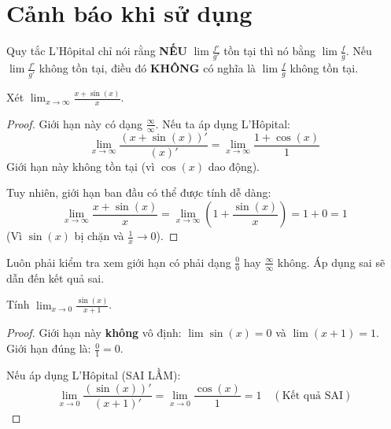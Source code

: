 \section{Cảnh báo khi sử dụng}

\begin{warning}
Quy tắc L'Hôpital chỉ nói rằng \textbf{NẾU} $\lim \frac{f'}{g'}$ tồn tại thì nó bằng $\lim \frac{f}{g}$.
Nếu $\lim \frac{f'}{g'}$ không tồn tại, điều đó \textbf{KHÔNG} có nghĩa là $\lim \frac{f}{g}$ không tồn tại.

\begin{example}
Xét $\lim_{x \to \infty} \frac{x + \sin(x)}{x}$.
\begin{proof}
Giới hạn này có dạng $\frac{\infty}{\infty}$. Nếu ta áp dụng L'Hôpital:
$$ \lim_{x \to \infty} \frac{(x + \sin(x))'}{(x)'} = \lim_{x \to \infty} \frac{1 + \cos(x)}{1} $$
Giới hạn này không tồn tại (vì $\cos(x)$ dao động).

Tuy nhiên, giới hạn ban đầu có thể được tính dễ dàng:
$$ \lim_{x \to \infty} \frac{x + \sin(x)}{x} = \lim_{x \to \infty} \left( 1 + \frac{\sin(x)}{x} \right) = 1 + 0 = 1 $$
(Vì $\sin(x)$ bị chặn và $\frac{1}{x} \to 0$).
\end{proof}
\end{example}
\end{warning}

\begin{warning}
Luôn phải kiểm tra xem giới hạn có phải dạng $\frac{0}{0}$ hay $\frac{\infty}{\infty}$ không. Áp dụng sai sẽ dẫn đến kết quả sai.

\begin{example}
Tính $\lim_{x \to 0} \frac{\sin(x)}{x+1}$.
\begin{proof}
Giới hạn này \textbf{không} vô định: $\lim \sin(x) = 0$ và $\lim (x+1) = 1$.
Giới hạn đúng là: $\frac{0}{1} = 0$.

Nếu áp dụng L'Hôpital (SAI LẦM):
$$ \lim_{x \to 0} \frac{(\sin(x))'}{(x+1)'} = \lim_{x \to 0} \frac{\cos(x)}{1} = 1 \quad (\text{Kết quả SAI}) $$
\end{proof}
\end{example}
\end{warning}